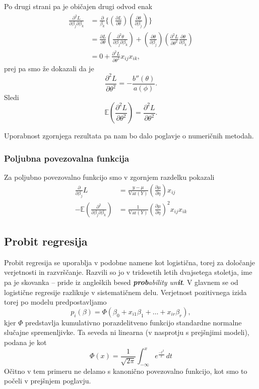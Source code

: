 \documentclass[12pt,a4paper]{amsart}
\theoremstyle{definition} %
\theoremstyle{plain} %
\begin{document}
Po drugi strani pa je običajen drugi odvod enak
\begin{align*}    
    \frac{\partial^2L}{\partial\beta_{j}\partial\beta_{k}} &= \frac{\partial}{\beta_{k}}\{\left(\frac{\partial L}{\partial\theta}\right)\left(\frac{\partial \theta}{\partial\beta_{j}}\right)\}\\
    &= \frac{\partial L}{\partial\theta}\left(\frac{\partial^2\theta}{\partial\beta_{j}\partial\beta_{k}}\right) + \left(\frac{\partial\theta}{\partial\beta_{j}}\right)\left(\frac{\partial^2L}{\partial\theta^2}\frac{\partial\theta}{\partial\beta_{k}}\right) \\
    &= 0 + \frac{\partial^2L}{\partial\theta^2}x_{ij}x_{ik},
\end{align*}
prej pa smo že dokazali da je
\[
    \frac{\partial^2L}{\partial\theta^2} = -\frac{b''(\theta)}{a(\phi)}.
\]
Sledi
\begin{equation}\label{pv2odv}    
    \mathbb{E}\left(\frac{\partial^2L}{\partial\theta^2}\right) = \frac{\partial^2L}{\partial\theta^2}.
\end{equation}

Uporabnost zgornjega rezultata pa nam bo dalo poglavje o numeričnih metodah.

\subsubsection{Poljubna povezovalna funkcija}
Za poljubno povezovalno funkcijo smo v zgornjem razdelku pokazali
\begin{align*}    
    \frac{\partial}{\partial\beta_{j}}L &= \frac{y-\mu}{\mathrm{Var}(Y)}\left(\frac{\partial\mu}{\partial\eta}\right)x_{ij}\\
    -\mathbb{E}(\frac{\partial^2}{\partial\beta_{j}\partial\beta_{k}}) &= \frac{1}{\mathrm{Var}(Y)}\left(\frac{\partial\mu}{\partial\eta}\right)^2x_{ij}x_{ik}
\end{align*}


\subsection{Probit regresija} %
Probit regresija se uporablja v podobne namene kot logistična, torej za določanje verjetnosti in razvrščanje. Razvili so jo v tridesetih letih
dvajsetega stoletja, ime pa je skovanka -- pride iz angleških besed \textit{\textbf{prob}ability un\textbf{it}}. V glavnem se od logistične regresije
razlikuje v sistematičnem delu. Verjetnost pozitivnega izida torej po modelu predpostavljamo
\begin{equation}
    p_{i}(\beta) = \Phi (\beta_{0} + x_{i1}\beta_{1} + \ldots + x_{ir}\beta_{r}),
\end{equation}
kjer $\Phi$ predstavlja kumulativno porazdelitveno funkcijo standardne normalne slučajne spremenljivke. Ta seveda ni linearna (v nasprotju s prejšnjimi modeli),
podana je kot 
\[
    \Phi(x) = \frac{1}{\sqrt{2\pi}}\int_{-\infty}^{x}e^{\frac{-t^2}{2}}\,dt
\]
Očitno v tem primeru ne delamo s kanonično povezovalno funkcijo, kot smo to počeli v prejšnjem poglavju.
\end{document}
